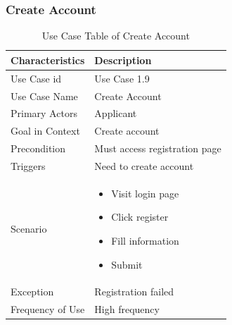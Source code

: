 \subsubsection{Create Account}
\begin{table}[!htbp]
    \centering
    \small
    \renewcommand{\arraystretch}{1.4}
    \caption{Use Case Table of Create Account}
    \label{tab:create_account_alt}
    
    \begin{tabularx}{\textwidth}{|l|X|}
        \hline
        \rowcolor[gray]{0.9} {Characteristics} & {Description} \\ \hline
        Use Case id & Use Case 1.9 \\ \hline
        Use Case Name & Create Account \\ \hline
        Primary Actors & Applicant \\ \hline
        Goal in Context & Create account \\ \hline
        Precondition & Must access registration page \\ \hline
        Triggers & Need to create account \\ \hline
        Scenario & 
        \begin{itemize}[leftmargin=*]
            \item Visit login page
            \item Click register
            \item Fill information
            \item Submit
        \end{itemize} \\ \hline
        Exception & Registration failed \\ \hline
        Frequency of Use & High frequency \\ \hline
    \end{tabularx}
\end{table}
\FloatBarrier